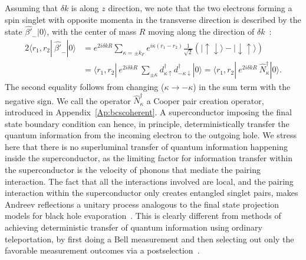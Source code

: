 \documentclass[12pt,letterpaper,aps,onecolumn,superscriptaddress,floatfix,notitlepage]{revtex4-1}
\begin{document}
	Assuming that $\delta k$ is along $z$ direction, we note that the two electrons forming a spin singlet with opposite momenta in the transverse direction is described by the state $\hat{\beta'}_{-}|0\rangle$, with the center of mass $R$ moving along the direction of $\delta k$~\cite{spintron}:
	\begin{align}
	\label{singlet}
	2\langle r_{1}, r_{2}|~\hat{\beta'}_{-}|0\rangle &=e^{2i\delta k R}\sum\limits_{\kappa=\pm k_{F}}e^{i\kappa(r_{1}-r_{2})}\frac{1}{\sqrt{2}}(|\uparrow\downarrow\rangle-|\downarrow\uparrow\rangle)\nonumber\\
	&=\langle r_{1}, r_{2}|~e^{2i\delta k R}~	\sum\limits_{\pm\kappa}d_{\kappa\uparrow}^{\dagger}d_{-\kappa\downarrow}^{\dagger}|0\rangle = \langle r_{1}, r_{2}|~e^{2i\delta k R}~\hat{N}_{\kappa}^{\dagger}|0\rangle.
	\end{align}
The second equality follows from changing ($\kappa\rightarrow-\kappa$) in the sum term with the negative sign. We call the operator $\hat{N}_{\kappa}^{\dagger}$ a Cooper pair creation operator, introduced in Appendix~\ref{Ap:bcscoherent}. A superconductor imposing the final state boundary condition can hence, in principle, deterministically transfer the quantum information from the incoming electron to the outgoing hole. We stress here that there is no superluminal transfer of quantum information happening inside the superconductor, as the limiting factor for information transfer within the superconductor is the velocity of phonons that mediate the pairing interaction. The fact that all the interactions involved are local, and the pairing interaction within the superconductor only creates entangled singlet pairs, makes Andreev reflections a unitary process analogous to the final state projection models for black hole evaporation~\cite{projection,horowitz}. This is clearly different from methods of achieving deterministic transfer of quantum information using ordinary teleportation, by first doing a Bell measurement and then selecting out only the favorable measurement outcomes via a postselection~\cite{lloyd2011closed}. 
	
\end{document}
